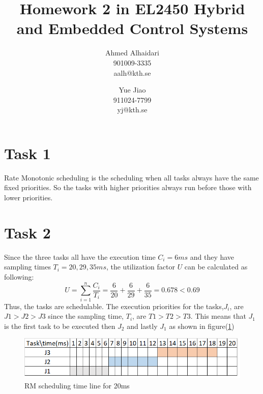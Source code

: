 \documentclass[a4paper,12pt,oneside,onecolumn]{article} %
\begin{document}

\title{Homework 2 in EL2450 Hybrid and Embedded Control Systems}
\author{
  Ahmed Alhaidari \\ 901009-3335 \\ aalh@kth.se 
  \and 
  Yue Jiao \\ 911024-7799 \\ yj@kth.se
  }

\maketitle                     %

\section*{Task 1}
Rate Monotonic scheduling is the scheduling when all tasks always have the same fixed priorities. So the tasks with higher priorities always run before those with lower priorities.

\section*{Task 2}
Since the three tasks all have the execution time $C_i = 6 ms$ and they have sampling times $T_i = {20, 29, 35}ms$, the utilization factor $U$ can be calculated as following:
\begin{equation}
U = \sum_{i=1}^n \frac{C_i}{T_i} = \frac{6}{20} + \frac{6}{29} + \frac{6}{35} = 0.678 < 0.69
\end{equation}
Thus, the tasks are schedulable. The execution priorities for the tasks,$J_i$, are $J1>J2>J3$ since the sampling time, $T_i$, are $T1>T2>T3$. This means that $J_1$ is the first task to be executed then $J_2$ and lastly $J_1$ as shown in figure(\ref{fig:1})

\begin{figure}[H]
    \centering
    \includegraphics[scale=1]{Task_2.png}
    \caption{RM scheduling time line for 20ms}
    \label{fig:1}
\end{figure} 
\end{document}
